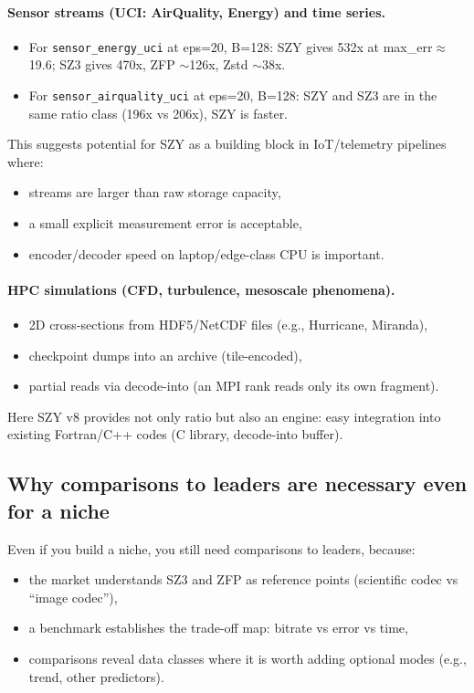 \documentclass[11pt,a4paper]{article}
\begin{document}
\paragraph{Sensor streams (UCI: AirQuality, Energy) and time series.}
\begin{itemize}
  \item For \texttt{sensor\_energy\_uci} at eps=20, B=128: SZY gives 532x at max\_err$\approx$19.6; SZ3 gives 470x, ZFP $\sim$126x, Zstd $\sim$38x.
  \item For \texttt{sensor\_airquality\_uci} at eps=20, B=128: SZY and SZ3 are in the same ratio class (196x vs 206x), SZY is faster.
\end{itemize}
This suggests potential for SZY as a building block in IoT/telemetry pipelines where:
\begin{itemize}
  \item streams are larger than raw storage capacity,
  \item a small explicit measurement error is acceptable,
  \item encoder/decoder speed on laptop/edge-class CPU is important.
\end{itemize}

\paragraph{HPC simulations (CFD, turbulence, mesoscale phenomena).}
\begin{itemize}
  \item 2D cross-sections from HDF5/NetCDF files (e.g., Hurricane, Miranda),
  \item checkpoint dumps into an archive (tile-encoded),
  \item partial reads via decode-into (an MPI rank reads only its own fragment).
\end{itemize}
Here SZY v8 provides not only ratio but also an engine: easy integration into existing Fortran/C++ codes (C library, decode-into buffer).

\subsection{Why comparisons to leaders are necessary even for a niche}
Even if you build a niche, you still need comparisons to leaders, because:
\begin{itemize}
  \item the market understands SZ3 and ZFP as reference points (scientific codec vs ``image codec''),
  \item a benchmark establishes the trade-off map: bitrate vs error vs time,
  \item comparisons reveal data classes where it is worth adding optional modes (e.g., trend, other predictors).
\end{itemize}
\end{document}
